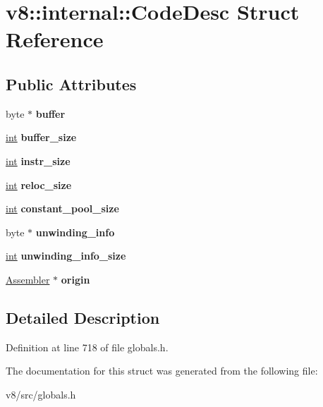 \hypertarget{structv8_1_1internal_1_1CodeDesc}{}\section{v8\+:\+:internal\+:\+:Code\+Desc Struct Reference}
\label{structv8_1_1internal_1_1CodeDesc}
\subsection*{Public Attributes}
\begin{DoxyCompactItemize}
\item 
\mbox{\label{structv8_1_1internal_1_1CodeDesc_a7f81b61966443cefdb7d66bbb0da57bf}} 
byte $\ast$ {\bfseries buffer}
\item 
\mbox{\label{structv8_1_1internal_1_1CodeDesc_ab886efa479651e14e7e6bc708a4be521}} 
\mbox{\hyperlink{classint}{int}} {\bfseries buffer\+\_\+size}
\item 
\mbox{\label{structv8_1_1internal_1_1CodeDesc_af887603bc5c17ab365f80879c2660727}} 
\mbox{\hyperlink{classint}{int}} {\bfseries instr\+\_\+size}
\item 
\mbox{\label{structv8_1_1internal_1_1CodeDesc_a4ec6827a7510122e162e8849e387f33b}} 
\mbox{\hyperlink{classint}{int}} {\bfseries reloc\+\_\+size}
\item 
\mbox{\label{structv8_1_1internal_1_1CodeDesc_afa0584ce34ae1cc2c416453778af3a1b}} 
\mbox{\hyperlink{classint}{int}} {\bfseries constant\+\_\+pool\+\_\+size}
\item 
\mbox{\label{structv8_1_1internal_1_1CodeDesc_aa845b7aff3c033fb3bac6b081732660c}} 
byte $\ast$ {\bfseries unwinding\+\_\+info}
\item 
\mbox{\label{structv8_1_1internal_1_1CodeDesc_a455890bf37c3535e221c9d982bc1f862}} 
\mbox{\hyperlink{classint}{int}} {\bfseries unwinding\+\_\+info\+\_\+size}
\item 
\mbox{\label{structv8_1_1internal_1_1CodeDesc_a5ea7fab993fb8dbcc98653be2d9792e3}} 
\mbox{\hyperlink{classv8_1_1internal_1_1Assembler}{Assembler}} $\ast$ {\bfseries origin}
\end{DoxyCompactItemize}


\subsection{Detailed Description}


Definition at line 718 of file globals.\+h.



The documentation for this struct was generated from the following file\+:\begin{DoxyCompactItemize}
\item 
v8/src/globals.\+h\end{DoxyCompactItemize}
